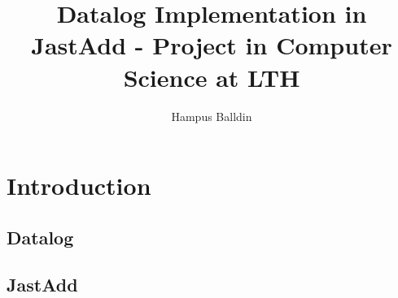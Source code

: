 \documentclass[a4paper]{article}
\title{Datalog Implementation in JastAdd - Project in Computer Science at LTH}
\author{Hampus Balldin
}
\theoremstyle{definition}
\begin{document}


\thispagestyle{empty}


\maketitle                    %
{}
\newpage
\tableofcontents
{}
\newpage
\section{Introduction}
\subsection{Datalog}
\subsection{JastAdd}
\newpage
{}

\end{document}
